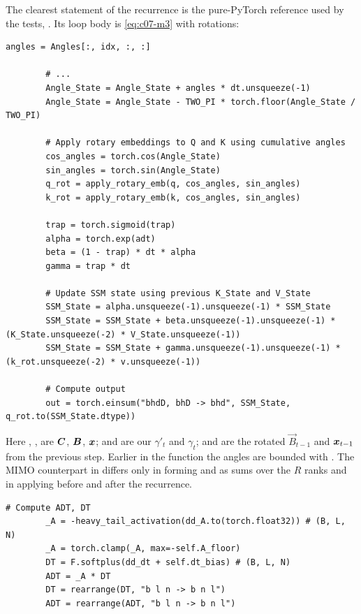 The clearest statement of the recurrence is the pure-PyTorch reference used by the tests,
. Its loop body is \cref{eq:c07-m3} with rotations:

\begin{lstlisting}[caption={Excerpt from \texttt{repos/\allowbreak state-spaces\_\_mamba/\allowbreak tests/\allowbreak ops/\allowbreak triton/\allowbreak test\_mamba3\_siso.py} (\texttt{mamba3\_siso\_step\_ref}).},label={lst:c07-m3-ref}]
        angles = Angles[:, idx, :, :]

        # ...
        Angle_State = Angle_State + angles * dt.unsqueeze(-1)
        Angle_State = Angle_State - TWO_PI * torch.floor(Angle_State / TWO_PI)

        # Apply rotary embeddings to Q and K using cumulative angles
        cos_angles = torch.cos(Angle_State)
        sin_angles = torch.sin(Angle_State)
        q_rot = apply_rotary_emb(q, cos_angles, sin_angles)
        k_rot = apply_rotary_emb(k, cos_angles, sin_angles)

        trap = torch.sigmoid(trap)
        alpha = torch.exp(adt)
        beta = (1 - trap) * dt * alpha
        gamma = trap * dt

        # Update SSM state using previous K_State and V_State
        SSM_State = alpha.unsqueeze(-1).unsqueeze(-1) * SSM_State 
        SSM_State = SSM_State + beta.unsqueeze(-1).unsqueeze(-1) * (K_State.unsqueeze(-2) * V_State.unsqueeze(-1))
        SSM_State = SSM_State + gamma.unsqueeze(-1).unsqueeze(-1) * (k_rot.unsqueeze(-2) * v.unsqueeze(-1))

        # Compute output
        out = torch.einsum("bhdD, bhD -> bhd", SSM_State, q_rot.to(SSM_State.dtype))
\end{lstlisting}

\noindent
Here , ,  are $\bm{C}$, $\bm{B}$, $\bm{x}$;  and  are our
$\gamma'_t$ and $\gamma_t$;  and  are the rotated
$\vec B_{t-1}$ and $\bm{x}_{t-1}$ from the previous step. Earlier in the function the angles
are bounded with . The MIMO counterpart
 in  differs only in
forming  and  as sums over the $R$ ranks and in applying
 before and  after the recurrence.

\begin{lstlisting}[caption={Excerpt from \texttt{repos/\allowbreak state-spaces\_\_mamba/\allowbreak mamba\_ssm/\allowbreak modules/\allowbreak mamba3.py} (\texttt{Mamba3.forward}): data-dependent $A$ and $\Delta$.},label={lst:c07-m3-adt}]
        # Compute ADT, DT
        _A = -heavy_tail_activation(dd_A.to(torch.float32)) # (B, L, N)
        _A = torch.clamp(_A, max=-self.A_floor)            
        DT = F.softplus(dd_dt + self.dt_bias) # (B, L, N)
        ADT = _A * DT
        DT = rearrange(DT, "b l n -> b n l")
        ADT = rearrange(ADT, "b l n -> b n l")
\end{lstlisting}


